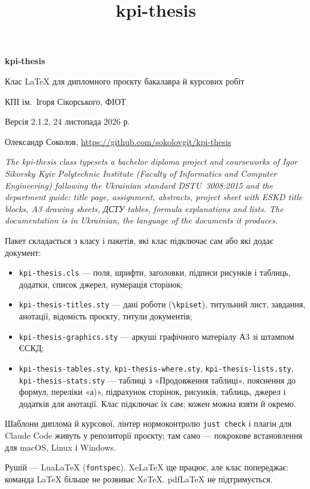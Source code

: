 \documentclass{kpi-thesis}
\title{kpi-thesis}
\begin{document}
\begin{center}
  \textbf{\large kpi-thesis}\par
  Клас LaTeX для дипломного проєкту бакалавра й курсових робіт\par
  КПІ ім.~Ігоря Сікорського, ФІОТ\par
  \medskip
  Версія 2.1.2, 24 листопада 2026 р.\par
  Олександр Соколов, \url{https://github.com/sokolovgit/kpi-thesis}
\end{center}

\bigskip
\noindent\textit{The kpi-thesis class typesets a bachelor diploma project and courseworks of
Igor Sikorsky Kyiv Polytechnic Institute (Faculty of Informatics and Computer Engineering)
following the Ukrainian standard DSTU~3008:2015 and the department guide: title page,
assignment, abstracts, project sheet with ESKD title blocks, A3 drawing sheets, ДСТУ tables,
formula explanations and lists. The documentation is in Ukrainian, the language of the
documents it produces.}


Пакет складається з класу і пакетів, які клас підключає сам або які додає документ:
\begin{itemize}
  \item \texttt{kpi-thesis.cls} --- поля, шрифти, заголовки, підписи рисунків і таблиць,
    додатки, список джерел, нумерація сторінок;
  \item \texttt{kpi-thesis-titles.sty} --- дані роботи (\verb|\kpiset|), титульний лист,
    завдання, анотації, відомість проєкту, титули документів;
  \item \texttt{kpi-thesis-graphics.sty} --- аркуші графічного матеріалу А3 зі штампом ЄСКД;
  \item \texttt{kpi-thesis-tables.sty}, \texttt{kpi-thesis-where.sty},
    \texttt{kpi-thesis-lists.sty}, \texttt{kpi-thesis-stats.sty} --- таблиці з
    «Продовження таблиці», пояснення до формул, переліки «а)», підрахунок сторінок, рисунків,
    таблиць, джерел і додатків для анотації. Клас підключає їх сам; кожен можна взяти й
    окремо.
\end{itemize}

Шаблони диплома й курсової, лінтер нормоконтролю \texttt{just check} і плагін для Claude Code
живуть у репозиторії проєкту; там само --- покрокове встановлення для macOS, Linux і Windows.


Рушій --- LuaLaTeX (\texttt{fontspec}). XeLaTeX ще працює, але клас попереджає: команда LaTeX
більше не розвиває XeTeX. pdfLaTeX не підтримується.
\end{document}

